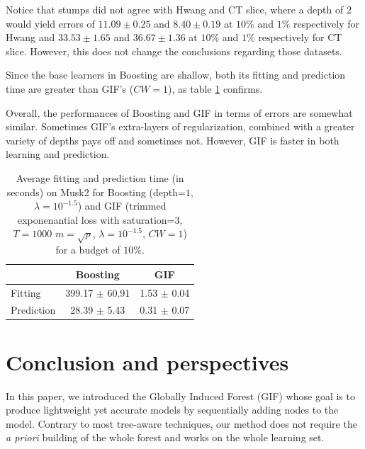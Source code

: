 \documentclass{article}
\begin{document}
Notice that stumps did not agree with Hwang and CT slice, where a depth of $2$ 
would yield errors of $11.09 \pm 0.25$ and $8.40 \pm 0.19$ at $10\%$ and 
$1\%$ respectively for Hwang and $33.53 \pm 1.65$ and $36.67 \pm 1.36$ at 
$10\%$ and $1\%$ respectively for CT slice. However, this does not change the 
conclusions regarding those datasets.

Since the base learners in Boosting are shallow, both its fitting and 
prediction time are greater than GIF's ($CW=1$), as table 
\ref{tab:boostingTime} confirms.

Overall, the performances of Boosting and GIF in terms of errors are somewhat 
similar. Sometimes GIF's extra-layers of regularization, combined with a 
greater variety of depths pays off and sometimes not. However, GIF is faster in 
both learning and prediction.


\begin{table}[t]
\caption{Average fitting and prediction time (in seconds) on Musk2 for 
Boosting (depth=$1$, $\lambda=10^{-1.5}$) and GIF (trimmed exponenantial loss 
with saturation=3, $T=1000$ $m=\sqrt{p}$, $\lambda=10^{-1.5}$, $CW=1$) for a 
budget of $10\%$.}
\label{tab:boostingTime}
\vskip 0.15in
\begin{center}
\begin{small}
\begin{tabular}{l|c|c}
\hline
& Boosting & GIF \\
\hline
Fitting & 399.17 $\pm$ 60.91 & 1.53 $\pm$ 0.04 \\
Prediction & 28.39 $\pm$ 5.43 & 0.31 $\pm$ 0.07 \\
\hline
\end{tabular}
\end{small}
\end{center}
\vskip -0.1in
\end{table}








\section{Conclusion and perspectives}
\label{sec:conclusion}

In this paper, we introduced the Globally Induced Forest (GIF) whose goal is to 
produce lightweight yet accurate models by sequentially adding nodes to the 
model. Contrary to most tree-aware techniques, our method does not require the 
{\it a priori} building of the whole forest and works on the whole learning set.
\end{document}
